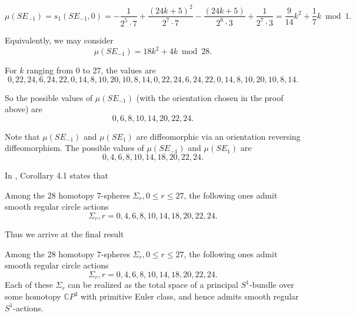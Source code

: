 \documentclass[twoside]{article}
\begin{document}
\[
\mu(SE_{-1}) = s_1(SE_{-1},0) = -\frac{1}{2^{5}  \cdot 7}  + \frac{ (24k  +  5)^2}{2^{7}  \cdot 7} 
-\frac{(24k  +  5)}{2^{6}  \cdot 3} + \frac{1}{2^{7}  \cdot 3}  = \frac{9}{14}k^2 + \frac{1}{7}k\bmod 1 . 
\]

Equivalently, we may consider
\[
\mu(SE_{-1}) = 18k^2 + 4k\bmod 28. 
\]

For $k$ ranging from $0$ to $27$, the values are
\[
0,22,24,6,24,22,0,14,8,10,20,10,8,14,0,22,24,6,24,22,0,14,8,10,
20,10,8,14. 
\]

So the possible values of $\mu(SE_{-1})$ (with the orientation chosen in the proof above) are 
\[
0,6,8,10,14,20,22,24. 
\]

Note that $\mu(SE_{-1})$ and $\mu(SE_{1})$ are diffeomorphic via an orientation reversing diffeomorphism. The possible values of $\mu(SE_{-1})$ and $\mu(SE_{1})$ are 
\[
0,4,6,8,10,14,18,20,22,24. 
\]

In \cite{yijiang}, Corollary 4.1 states that
\begin{prop}
	Among the 28 homotopy $7$-spheres $\Sigma_r,0 \leq r \leq 27$,  the following ones admit smooth regular circle actions
	\[
	\Sigma_r,r = 0,4,6,8,10,14,18,20,22,24. 
	\]
\end{prop}

Thus we arrive at the final result
\begin{thm}
	Among the 28 homotopy $7$-spheres $\Sigma_r,0 \leq r \leq 27$,  the following ones admit smooth regular circle actions
	\[
	\Sigma_r,r = 0,4,6,8,10,14,18,20,22,24. 
	\]
	Each of these $\Sigma_r$ can be realized as the total space of  a principal $S^1$-bundle over some homotopy $\mathbb{C}P^3$ with primitive Euler class, and hence admits smooth regular $S^1$-actions. 
\end{thm}
\end{document}

